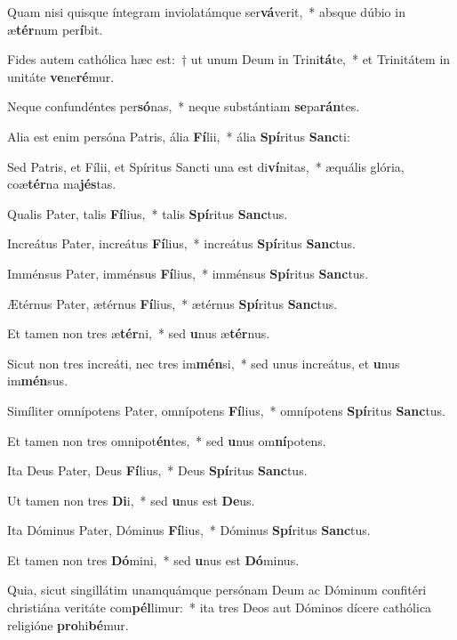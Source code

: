 \item Quam nisi quisque íntegram inviolatámque ser\textbf{vá}verit,~* absque dúbio in æ\textbf{tér}num per\textbf{í}bit.
\item Fides autem cathólica hæc est:~† ut unum Deum in Trini\textbf{tá}te,~* et Trinitátem in unitáte \textbf{ve}ne\textbf{ré}mur.
\item Neque confundéntes per\textbf{só}nas,~* neque substántiam \textbf{se}pa\textbf{rán}tes.
\item Alia est enim persóna Patris, ália \textbf{Fí}lii,~* ália \textbf{Spí}ritus \textbf{Sanc}ti:
\item Sed Patris, et Fílii, et Spíritus Sancti una est di\textbf{ví}nitas,~* æquális glória, coæ\textbf{tér}na ma\textbf{jés}tas.
\item Qualis Pater, talis \textbf{Fí}lius,~* talis \textbf{Spí}ritus \textbf{Sanc}tus.
\item Increátus Pater, increátus \textbf{Fí}lius,~* increátus \textbf{Spí}ritus \textbf{Sanc}tus.
\item Imménsus Pater, imménsus \textbf{Fí}lius,~* imménsus \textbf{Spí}ritus \textbf{Sanc}tus.
\item Ætérnus Pater, ætérnus \textbf{Fí}lius,~* ætérnus \textbf{Spí}ritus \textbf{Sanc}tus.
\item Et tamen non tres æ\textbf{tér}ni,~* sed \textbf{u}nus æ\textbf{tér}nus.
\item Sicut non tres increáti, nec tres im\textbf{mén}si,~* sed unus increátus, et \textbf{u}nus im\textbf{mén}sus.
\item Simíliter omnípotens Pater, omnípotens \textbf{Fí}lius,~* omnípotens \textbf{Spí}ritus \textbf{Sanc}tus.
\item Et tamen non tres omnipot\textbf{én}tes,~* sed \textbf{u}nus om\textbf{ní}potens.
\item Ita Deus Pater, Deus \textbf{Fí}lius,~* Deus \textbf{Spí}ritus \textbf{Sanc}tus.
\item Ut tamen non tres \textbf{Di}i,~* sed \textbf{u}nus est \textbf{De}us.
\item Ita Dóminus Pater, Dóminus \textbf{Fí}lius,~* Dóminus \textbf{Spí}ritus \textbf{Sanc}tus.
\item Et tamen non tres \textbf{Dó}mini,~* sed \textbf{u}nus est \textbf{Dó}minus.
\item Quia, sicut singillátim unamquámque persónam Deum ac Dóminum confitéri christiána veritáte com\textbf{pél}limur:~* ita tres Deos aut Dóminos dícere cathólica religióne \textbf{pro}hi\textbf{bé}mur.
